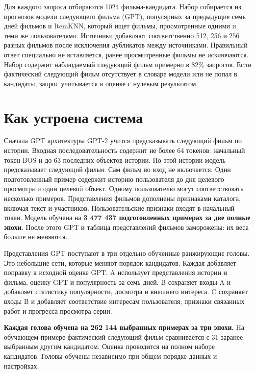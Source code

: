 \documentclass[11pt,a4paper]{article}
\begin{document}
Для каждого запроса отбираются 1024 фильма-кандидата. Набор собирается из прогнозов модели следующего фильма (GPT), популярных за предыдущие семь дней фильмов и ItemKNN, который ищет фильмы, просмотренные одними и теми же пользователями. Источники добавляют соответственно 512, 256 и 256 разных фильмов после исключения дубликатов между источниками. Правильный ответ специально не вставляется, ранее просмотренные фильмы не исключаются. Набор содержит наблюдаемый следующий фильм примерно в 82\% запросов. Если фактический следующий фильм отсутствует в словаре модели или не попал в кандидаты, запрос учитывается в оценке с нулевым результатом.

\newpage

\section{Как устроена система}

Сначала GPT архитектуры GPT-2 учится предсказывать следующий фильм по истории. Входная последовательность содержит не более 64 токенов: начальный токен BOS и до 63 последних объектов истории. По этой истории модель предсказывает следующий фильм. Сам фильм во вход не включается. Один подготовленный пример содержит историю пользователя до дня целевого просмотра и один целевой объект. Одному пользователю могут соответствовать несколько примеров. Представления фильмов дополнены признаками каталога, включая текст и участников. Пользовательские признаки входят в начальный токен. Модель обучена на \textbf{3 477 437 подготовленных примерах за две полные эпохи}. После этого GPT и таблица представлений фильмов заморожены: их веса больше не меняются.

Представления GPT поступают в три отдельно обученные ранжирующие головы. Это небольшие сети, которые меняют порядок кандидатов. Каждая добавляет поправку к исходной оценке GPT. A использует представления истории и фильма, оценку GPT и популярность за семь дней. B сохраняет входы A и добавляет статистику популярности, досмотра и внешнего интереса. C сохраняет входы B и добавляет соответствие интересам пользователя, признаки связанных работ и прогресса просмотра серии.

\textbf{Каждая голова обучена на 262 144 выбранных примерах за три эпохи.} На обучающем примере фактический следующий фильм сравнивается с 31 заранее выбранным другим кандидатом. Оценка проводится на полном наборе кандидатов. Головы обучены независимо при общем порядке данных и настройках.
\end{document}
